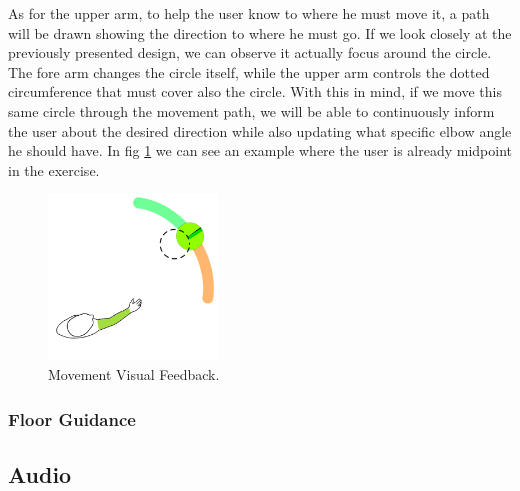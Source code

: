 As for the upper arm, to help the user know to where he must move it, a path will be drawn showing the direction to where he must go. 
If we look closely at the previously presented design, we can observe it actually focus around the circle. 
The fore arm changes the circle itself, while the upper arm controls the dotted circumference that must cover also the circle. 
With this in mind, if we move this same circle through the movement path, we will be able to continuously inform the user about the 
desired direction while also updating what specific elbow angle he should have. 
In fig \ref{fig:movementguidancefeedback} we can see an example where the user is already midpoint in the exercise.



\begin{figure}[!t]
    \begin{center}
        \includegraphics[width=0.4\textwidth]{imgs/approach/movementguidancefeedback}
    \end{center}
    \caption{Movement Visual Feedback.}
    \label{fig:movementguidancefeedback}
\end{figure}


\subsubsection{Floor Guidance}

\subsection{Audio}